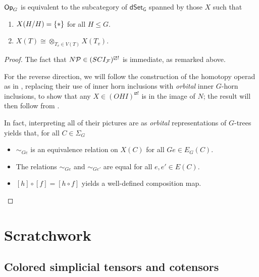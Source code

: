 \documentclass[a4paper,10pt
,draft
]{article}%
\renewcommand{\F}{\mathcal F}
\renewcommand{\1}{\ensuremath{\mathbb{id}}}
\begin{document}
\begin{proposition}
      $\mathsf{Op}_G$ is equivalent to the subcategory of $\mathsf{dSet_G}$ spanned by those $X$ such that
      \begin{enumerate}
      \item $X(H/H) = \set{\**}$ for all $H \leq G$.
      \item $X(T) \cong \otimes_{T_v \in V(T)}X(T_v)$. 
      \end{enumerate}
\end{proposition}
\begin{proof}
      The fact that $N\P \in (SCI_{\F})^{\boxslash !}$ is immediate, as remarked above.

      For the reverse direction, we will follow the construction of the homotopy operad as in \cite[\S 6]{MW09},
      replacing their use of inner horn inclusions with \textit{orbital} inner $G$-horn inclusions,
      to show that any $X \in (OHI)^{\boxslash !}$ is in the image of $N$; 
      the result will then follow from \cite[HYPER PROP]{BP18}.

      In fact, interpreting all of their pictures are as \textit{orbital} representations of $G$-trees yields that,
      for all $C \in \Sigma_G$
      \begin{itemize}
      \item $\sim_{G e}$ is an equivalence relation on $X(C)$ for all $Ge \in E_G(C)$.
      \item The relations $\sim_{G e}$ and $\sim_{G e'}$ are equal for all $e,e'\in E(C)$.
      \item $[h] \circ [f] = [h \circ f]$ yields a well-defined composition map.
      \end{itemize}
\end{proof}



\newpage



\section{Scratchwork}

\subsection{Colored simplicial tensors and cotensors}
\end{document}
